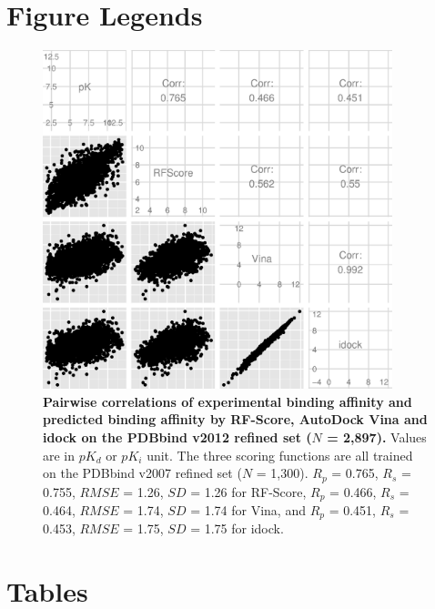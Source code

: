 \documentclass[10pt]{article}
\begin{document}


\section*{Figure Legends}

\begin{figure}[!ht]
\begin{center}
\includegraphics[width=4in]{../istar/PDBbind2012Correlations.eps}
\end{center}
\caption{
{\bf Pairwise correlations of experimental binding affinity and predicted binding affinity by RF-Score, AutoDock Vina and idock on the PDBbind v2012 refined set ($N$ = 2,897).} Values are in $pK_d$ or $pK_i$ unit. The three scoring functions are all trained on the PDBbind v2007 refined set ($N$ = 1,300). $R_p$ = 0.765, $R_s$ = 0.755, $RMSE$ = 1.26, $SD$ = 1.26 for RF-Score, $R_p$ = 0.466, $R_s$ = 0.464, $RMSE$ = 1.74, $SD$ = 1.74 for Vina, and $R_p$ = 0.451, $R_s$ = 0.453, $RMSE$ = 1.75, $SD$ = 1.75 for idock.
}
\label{PDBbind2012Correlations}
\end{figure}

\section*{Tables}
\end{document}
